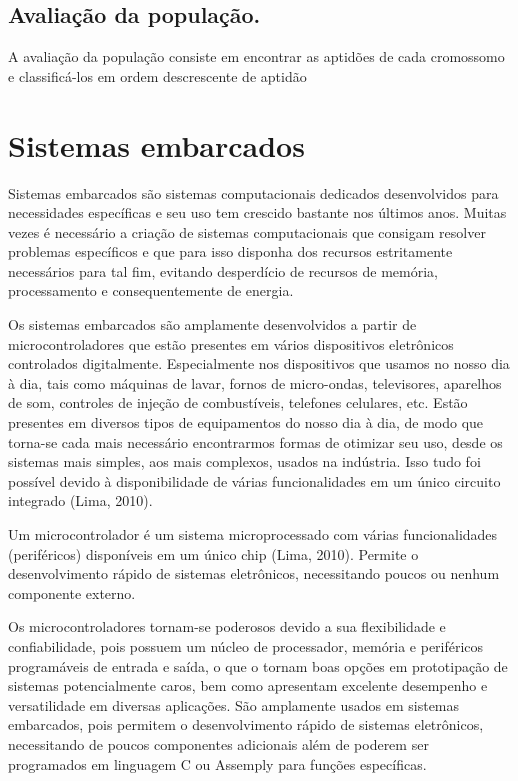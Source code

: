 \documentclass[
    12pt,               %
    oneside,%
    a4paper,            %
    english,            %
    french,             %
    spanish,            %
    brazil,             %
    ]{abntex2}
\begin{document}
\section{Avaliação da população.}

  A avaliação da população consiste em encontrar as aptidões de cada cromossomo e classificá-los em ordem descrescente de aptidão

\chapter{Sistemas embarcados}

  Sistemas embarcados são sistemas computacionais dedicados desenvolvidos para necessidades específicas e seu uso tem crescido bastante nos últimos anos.  Muitas vezes é necessário a criação de sistemas computacionais que consigam resolver problemas específicos e que para isso disponha dos recursos estritamente necessários para tal fim, evitando desperdício de recursos de memória, processamento e consequentemente de energia. 

  Os sistemas embarcados são amplamente desenvolvidos a partir de microcontroladores que estão presentes em vários dispositivos eletrônicos controlados digitalmente. Especialmente nos dispositivos que usamos no nosso dia à dia, tais como máquinas de lavar, fornos de micro-ondas, televisores, aparelhos de som, controles de injeção de combustíveis, telefones celulares, etc. Estão presentes em diversos tipos de equipamentos do nosso dia à dia, de modo que torna-se cada mais necessário encontrarmos formas de otimizar seu uso, desde os sistemas mais simples, aos mais complexos, usados na indústria. Isso tudo foi possível devido à disponibilidade de  várias funcionalidades em  um único circuito integrado  (Lima, 2010).

  Um microcontrolador é um sistema microprocessado com várias funcionalidades (periféricos) disponíveis em um único chip (Lima, 2010).  Permite o desenvolvimento rápido de sistemas eletrônicos, necessitando poucos ou nenhum componente externo.

  Os microcontroladores tornam-se poderosos devido a sua flexibilidade e confiabilidade, pois  possuem um núcleo de processador, memória e periféricos programáveis de entrada e saída, o que o tornam boas opções em prototipação de sistemas potencialmente caros, bem como apresentam excelente desempenho e versatilidade em diversas aplicações. São amplamente usados em sistemas embarcados, pois permitem o desenvolvimento rápido de sistemas eletrônicos, necessitando de poucos componentes adicionais além de poderem ser programados em linguagem C ou Assemply para funções específicas.
\end{document}
